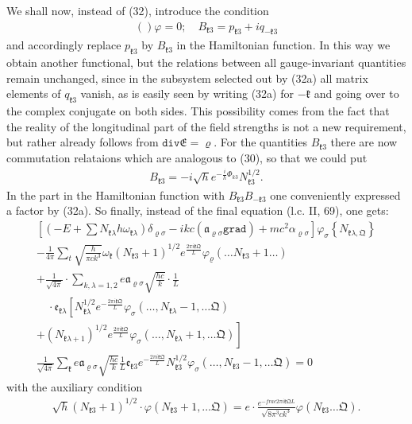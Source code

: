\documentclass[a4paper,11pt]{article}
\newcommand{\?}[2]{#1\footnote{\textsc{Translator note}: #2}}
\newcommand{\nequ}[2]{\begin{align*}\tag{#1}#2\end{align*}}
\renewcommand{\operatorfont}[1]{\texttt{#1}}
\newcommand{\grad}{\operatorfont{grad}}
\renewcommand{\div}{\operatorfont{div}}
\renewcommand{\exp}[1]{e^{#1}}
\newcommand{\mf}[1]{\mathfrak{#1}}
\begin{document}
We shall now, instead of (32), introduce the condition
\nequ{32a}{
\left(\right)\varphi = 0;\quad
B_{\mf{k}3} = p_{\mf{k}3} + iq_{-\mf{k}3}
}
and accordingly replace $p_{\mf{k}3}$ by $B_{\mf{k}3}$ in the Hamiltonian function. In this way we obtain another functional, but the relations between all gauge-invariant quantities remain unchanged, since in the subsystem selected out by (32a) all matrix elements of $q_{\mf{k}3}$ vanish, as is easily seen by writing (32a) for $-\mf{k}$ and going over to the complex conjugate on both sides. This possibility comes from the fact that the reality of the longitudinal part of the field strengths is not a new requirement, but rather already follows from $\div\mf{E} = \varrho$. For the quantities $B_{\mf{k}3}$ there are now commutation relataions which are analogous to (30), so that we could put
\nequ{33}{
B_{\mf{k}3} = -i\sqrt{h}\exp{-\frac{i}{h}\Phi_{k3}}N_{\mf{k}3}^{1/2}.
}
In the part in the Hamiltonian function with $B_{\mf{k}3}B_{-\mf{k}3}$ one conveniently expressed a factor by (32a). So finally, instead of the final equation (l.c. II, 69), one gets:
\nequ{34}{
\left[\left(-E + \sum N_{\mf{k}\lambda} h \omega_{\mf{k}\lambda}\right)\delta_{\varrho\sigma} - 
ikc\left(\mf{a}_{\varrho\sigma}\grad\right) + 
mc^2\alpha_{\varrho\sigma}\right]\varphi_\sigma
\left\{N_{\mf{k}\lambda,\mf{Q}}\right\}\\
- \frac{1}{4\pi}\sum\limits_t\sqrt{\frac{h}{\pi c k^3}}
\omega_\mf{k}\left(N_{\mf{k}3} + 1\right)^{1/2}
\exp{\frac{2\pi i \mf{kQ}}{L}}\varphi_\varrho
\left(\dots N_{\mf{k}3} + 1\dots\right)\\
+ \frac{1}{\sqrt{4\pi}}\cdot \sum\limits_{k,\lambda=1,2}
e\mf{a}_{\varrho\sigma}\sqrt{\frac{hc}{k}}\cdot\frac{1}{L}\\
\quad \cdot \mf{e}_{\mf{k}\lambda}\left[N_{\mf{k}\lambda}^{1/2}
\exp{-\frac{2\pi i \mf{kQ}}{L}} \varphi_\sigma(\dots, N_{\mf{k}\lambda} - 1, \dots \mf{Q})\right.\\\left.
+ \left(N_{\mf{k}\lambda + 1}\right)^{1/2} \exp{\frac{2\pi i \mf{kQ}}{L}}
\varphi_\sigma(\dots, N_{\mf{k}\lambda} + 1, \dots \mf{Q})\right]\\
\frac{1}{\sqrt{4\pi}}\sum\limits_\mf{k}e\mf{a}_{\varrho\sigma}
\sqrt{\frac{hc}{k}}\frac{1}{L}\mf{e}_{\mf{k}3}
\exp{-\frac{2\pi i \mf{kQ}}{L}}N_{\mf{k}3}^{1/2}
\varphi_\sigma\left(\dots,N_{\mf{k}3}-1,\dots \mf{Q}\right) = 0
}
with the auxiliary condition
\nequ{34a}{
\sqrt{h}\left(N_{\mf{k}3} + 1\right)^{1/2}\cdot
\varphi\left(N_{\mf{k}3} + 1, \dots \mf{Q}\right) = 
e\cdot\frac{\exp{-frac{2\pi i\mf{kQ}}{L}}}{\sqrt{8\pi^3 c k^3}}
\varphi\left(N_{\mf{k}3} \dots \mf{Q}\right).
}
\end{document}
